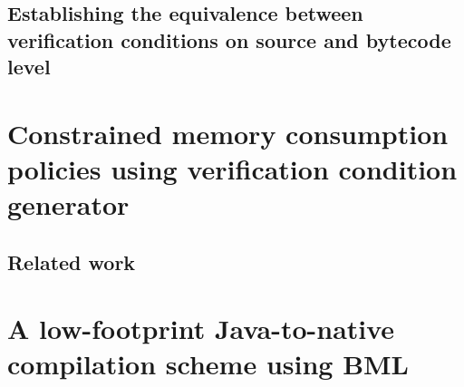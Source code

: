 \documentclass[10pt,a4paper]{book}
\begin{document}
  
   
  

  
  
    
    \section{Establishing the equivalence between verification conditions on source and bytecode level} \label{pog:wpBcGeneral}
    
    
 
\chapter{Constrained memory consumption policies using verification condition generator}\label{applications:memory}
  
  \lstset{numbers=none}

  \label{sec:verif}
     
  
  
  
  \section{Related work}\label{sec:rel}
  

\chapter{A low-footprint Java-to-native compilation scheme using BML}\label{applications:optimComp}
  \lstset{frameround=tttt}
  
  
  
  
  
  
   
   
  
  
\end{document}
